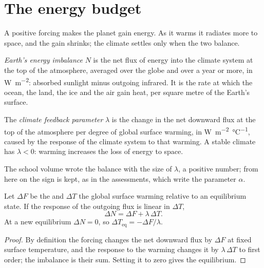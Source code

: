 \section{The energy budget}\label{sec:b2:anthropogenic-climate-change:energy}

A positive forcing makes the planet gain energy. As it warms it radiates more to space, and the
gain shrinks; the climate settles only when the two balance.

\begin{definition}\label{def:b2:anthropogenic-climate-change:eei}
\emph{Earth's energy imbalance} $N$ is the net flux of energy into
the climate system at the top of the atmosphere, averaged over the globe and over a year or more,
in \unit{W.m^{-2}}: absorbed sunlight minus outgoing infrared. It is the rate at which the ocean,
the land, the ice and the air gain heat, per square metre of the Earth's surface.
\end{definition}

\begin{definition}\label{def:b2:anthropogenic-climate-change:lambda}
The \emph{climate feedback parameter} $\lambda$ is the change in
the net downward flux at the top of the atmosphere per degree of global surface warming, in
\unit{W.m^{-2}.\celsius^{-1}}, caused by the response of the climate system to that warming. A
stable climate has $\lambda < 0$: warming increases the loss of energy to space.
\end{definition}

The school volume wrote the balance with the size of $\lambda$, a positive number; from here on the
sign is kept, as in the assessments, which write the parameter $\alpha$.

\begin{proposition}\label{prop:b2:anthropogenic-climate-change:balance}
Let $\Delta F$ be the  and $\Delta T$ the global surface warming
relative to an equilibrium state. If the response of the outgoing flux is linear in $\Delta T$,
\[
  \Delta N = \Delta F + \lambda\,\Delta T .
\]
At a new equilibrium $\Delta N = 0$, so $\Delta T_{\text{eq}} = -\Delta F/\lambda$.
\end{proposition}
\begin{proof}
By definition the forcing changes the net downward flux by $\Delta F$ at fixed surface
temperature, and the response to the warming changes it by $\lambda\,\Delta T$ to first order;
the imbalance is their sum. Setting it to zero gives the equilibrium.
\end{proof}

